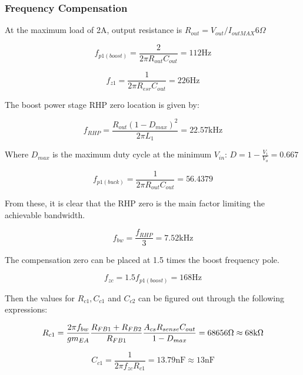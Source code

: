 \documentclass[11pt, a4paper]{article}
\begin{document}
\subsubsection{Frequency Compensation}

At the maximum load of 2A, output resistance is $R_{out} = V_{out}/I_{outMAX} 6\Omega$

\begin{equation}
    f_{p1(boost)} = \frac{2}{2\pi R_{out}C_{out}} = 112 \text{Hz}    
\end{equation}

\begin{equation}
    f_{z1} = \frac{1}{2\pi R_{esr}C_{out}} = 226 \text{Hz}    
\end{equation}

The boost power stage RHP zero location is given by: 

\begin{equation}
    f_{RHP} = \frac{R_{out}(1-D_{max})^2}{2\pi L_1} = 22.57\text{kHz}
\end{equation}

Where $D_{max}$ is the maximum duty cycle at the minimum $V_{in}$: $D = 1-\frac{V_i}{V_o} = 0.667$ 

\begin{equation}
    f_{p1(buck)} = \frac{1}{2\pi R_{out}C_{out}} = 56.4379  
\end{equation}

From these, it is clear that the RHP zero is the main factor limiting the achievable bandwidth.

\begin{equation}
    f_{bw} = \frac{f_{RHP}}{3} = 7.52\text{kHz}    
\end{equation}

The compensation zero can be placed at 1.5 times the boost frequency pole.

\begin{equation}
    f_{zc} = 1.5f_{p1(boost)} = 168\text{Hz}  
\end{equation}

Then the values for $R_{c1}, C_{c1}$ and $C_{c2}$ can be figured out through the following expressions:

\begin{equation}
    R_{c1} = \frac{2\pi f_{bw}}{gm_{EA}}\frac{R_{FB1}+R_{FB2}}{R_{FB1}}\frac{A_{cs}R_{sense}C_{out}}{1-D_{max}} = 68656\Omega \approx 68\text k \Omega  
\end{equation}

\begin{equation}
    C_{c1} = \frac{1}{2\pi f_{zc} R_{c1}} = 13.79 \text{nF} \approx 13 \text{nF}    
\end{equation}
\end{document}
